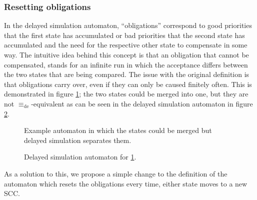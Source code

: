 \vspace{10pt}

\subsubsection{Resetting obligations} 
In the delayed simulation automaton, \enquote{obligations} correspond to good priorities that the first state has accumulated or bad priorities that the second state has accumulated and the need for the respective other state to compensate in some way. The intuitive idea behind this concept is that an obligation that cannot be compensated, stands for an infinite run in which the acceptance differs between the two states that are being compared. The issue with the original definition is that obligations carry over, even if they can only be caused finitely often. This is demonstrated in figure \ref{fig:fritzwilke:reset_oblig_example}; the two states could be merged into one, but they are not $\equiv_\text{de}$-equivalent as can be seen in the delayed simulation automaton in figure \ref{fig:fritzwilke:reset_oblig_example_dea}.

\begin{figure}
\centering
{}
\caption{Example automaton in which the states could be merged but delayed simulation separates them.}
\label{fig:fritzwilke:reset_oblig_example}
\end{figure}

\begin{figure}
\centering
{}
\caption{Delayed simulation automaton for \ref{fig:fritzwilke:reset_oblig_example}.}
\label{fig:fritzwilke:reset_oblig_example_dea}
\end{figure}

As a solution to this, we propose a simple change to the definition of the automaton which resets the obligations every time, either state moves to a new SCC. 

